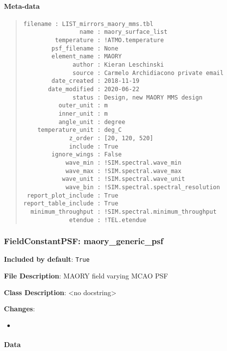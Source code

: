 \paragraph{Meta-data%
  \label{meta-data}%
}

\begin{quote}
\begin{alltt}
\begin{lstlisting}[frame=single]
            filename : LIST_mirrors_maory_mms.tbl
                name : maory_surface_list
         temperature : !ATMO.temperature
        psf_filename : None
        element_name : MAORY
              author : Kieran Leschinski
              source : Carmelo Archidiacono private email
        date_created : 2018-11-19
       date_modified : 2020-06-22
              status : Design, new MAORY MMS design
          outer_unit : m
          inner_unit : m
          angle_unit : degree
    temperature_unit : deg_C
             z_order : [20, 120, 520]
             include : True
        ignore_wings : False
            wave_min : !SIM.spectral.wave_min
            wave_max : !SIM.spectral.wave_max
           wave_unit : !SIM.spectral.wave_unit
            wave_bin : !SIM.spectral.spectral_resolution
 report_plot_include : True
report_table_include : True
  minimum_throughput : !SIM.spectral.minimum_throughput
             etendue : !TEL.etendue
\end{lstlisting}
\end{alltt}
\end{quote}


\subsubsection{FieldConstantPSF: \textquotedbl{}maory\_generic\_psf\textquotedbl{}%
  \label{fieldconstantpsf-maory-generic-psf}%
}

\textbf{Included by default}: \texttt{True}

\textbf{File Description}: MAORY field varying MCAO PSF

\textbf{Class Description}: <no docstring>

\textbf{Changes}:

\begin{itemize}
\item \end{itemize}


\paragraph{Data%
  \label{id1}%
}

